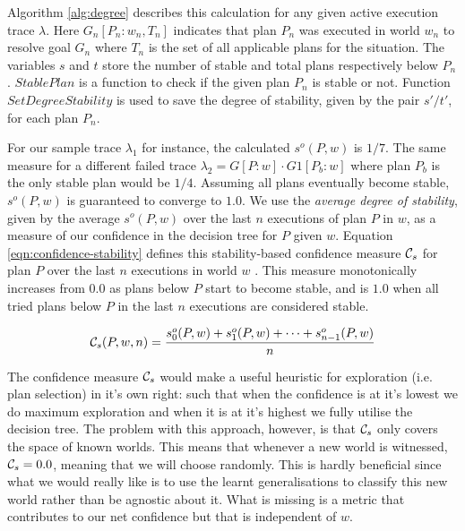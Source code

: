 Algorithm \ref{alg:degree} describes this calculation for any given active execution trace $\lambda$. Here $G_n[P_n:w_n,T_n]$ indicates that plan $P_n$ was executed in world $w_n$ to resolve goal $G_n$ where $T_n$ is the set of all applicable plans for the situation. The variables $s$ and $t$ store the number of stable and total plans respectively below $P_n$. $StablePlan$ is a function to check if the given plan $P_n$ is stable or not. Function $SetDegreeStability$ is used to save the degree of stability, given by the pair $s'/t'$, for each plan $P_n$.

\begin{algorithm}[ht]
\caption{$UpdateDegreeStability(\lambda, s, t, k, \epsilon)$}
\label{alg:degree}
\end{algorithm}

For our sample trace $\lambda_1$ for instance, the calculated $s^o(P,w)$ is $1/7$. The same measure for a different failed trace $\lambda_2=G[P:w] \cdot G1[P_b:w]$ where plan $P_b$ is the only stable plan would be $1/4$. Assuming all plans eventually become stable, $s^o(P,w)$ is guaranteed to converge to $1.0$. We use the {\em average degree of stability}, given by the average $s^o(P,w)$ over the last $n$ executions of plan $P$ in $w$, as a measure of our confidence in the decision tree for $P$ given $w$. Equation \ref{eqn:confidence-stability} defines this stability-based confidence measure ${\mathcal{C}}_s$ for plan $P$ over the last $n$ executions in world $w$ . This measure monotonically increases from $0.0$ as plans below $P$ start to become stable, and is $1.0$ when all tried plans below $P$ in the last $n$ executions are considered stable. 

\begin{equation}
{\ensuremath{\mathcal{C}}}_s(P,w,n) = \frac{s^o_0(P,w) + s^o_1(P,w) + \cdots + s^o_{n-1}(P,w)}{n}
\label{eqn:confidence-stability}
\end{equation}


The confidence measure ${\mathcal{C}}_s$ would make a useful heuristic for exploration (i.e. plan selection) in it's own right: such that when the confidence is at it's lowest we do maximum exploration and when it is at it's highest we fully utilise the decision tree. The problem with this approach, however, is that ${\mathcal{C}}_s$ only covers the space of known worlds. This means that whenever a new world is witnessed, ${\mathcal{C}}_s=0.0$, meaning that we will choose randomly. This is hardly beneficial since what we would really like is to use the learnt generalisations to classify this new world rather than be agnostic about it. What is missing is a metric that contributes to our net confidence but that is independent of $w$.


